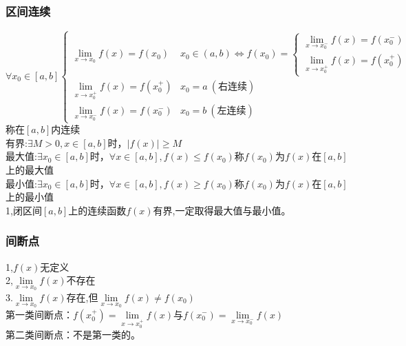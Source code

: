 \subsubsection{区间连续}
$\forall x_0\in\left[a,b\right]\begin{cases}
    \lim\limits_{x\to x_0}f(x)=f(x_0)&x_0\in\left(a,b\right) \Leftrightarrow f(x_0)=\begin{cases}
    \lim\limits_{x \to x_0^-}f(x)= f(x_0^-)\\
    \lim\limits_{x \to x_0^+}f(x)= f(x_0^+)
\end{cases}\\
    \lim\limits_{x\to x_0^+}f(x)=f(x_0^+)&x_0=a\ \left(\mbox{右连续}\right)\\
    \lim\limits_{x\to x_0^-}f(x)=f(x_0^-)&x_0=b\ \left(\mbox{左连续}\right)
\end{cases}$\\称在$\left[a,b\right]$内连续\\
有界:$\exists M>0,x\in\left[a,b\right]$时，$\left|f(x)\right|\geqslant M$\\
最大值:$\exists x_0\in\left[a,b\right]$时，$\forall x\in\left[a,b\right] ,f(x)\leqslant f(x_0)$称$f(x_0)$为$f(x)$在$\left[a,b\right]$上的最大值\\
最小值:$\exists x_0\in\left[a,b\right]$时，$\forall x\in\left[a,b\right] ,f(x)\geqslant f(x_0)$称$f(x_0)$为$f(x)$在$\left[a,b\right]$上的最小值\\
1,闭区间$\left[a,b\right]$上的连续函数$f(x)$有界,一定取得最大值与最小值。
\subsubsection{间断点}
1,$f(x)$无定义\\
2,$\lim\limits_{x\to x_0}f(x)$不存在\\
3.$\lim\limits_{x\to x_0}f(x)$存在,但$\lim\limits_{x\to x_0}f(x)\neq f(x_0)$\\
第一类间断点：$f(x_0^+)=\lim\limits_{x\to x_0^+}f(x)$与$f(x_0^-)=\lim\limits_{x\to x_0^-}f(x)$\\
第二类间断点：不是第一类的。
